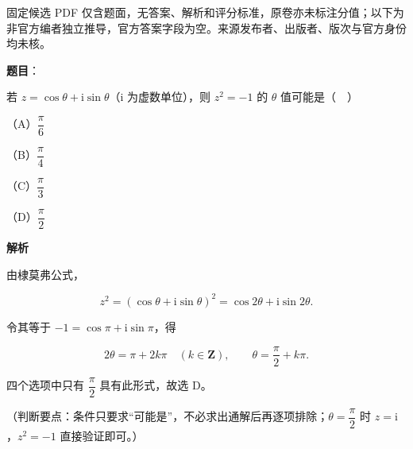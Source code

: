 

\begin{gktip}
固定候选 PDF 仅含题面，无答案、解析和评分标准，原卷亦未标注分值；以下为非官方编者独立推导，官方答案字段为空。来源发布者、出版者、版次与官方身份均未核。
\end{gktip}

\begin{answer}

\textbf{题目}：

若 $z=\cos\theta+\mathrm i\sin\theta$（$\mathrm i$ 为虚数单位），则 $z^2=-1$ 的 $\theta$ 值可能是（　）

（A）$\dfrac{\pi}{6}$

（B）$\dfrac{\pi}{4}$

（C）$\dfrac{\pi}{3}$

（D）$\dfrac{\pi}{2}$

\textbf{解析}

由棣莫弗公式，

\nopagebreak[4]
\[z^2=(\cos\theta+\mathrm i\sin\theta)^2=\cos2\theta+\mathrm i\sin2\theta.\]

令其等于 $-1=\cos\pi+\mathrm i\sin\pi$，得

\nopagebreak[4]
\[2\theta=\pi+2k\pi\quad(k\in\mathbf Z),\qquad \theta=\frac{\pi}{2}+k\pi.\]

四个选项中只有 $\dfrac{\pi}{2}$ 具有此形式，故选 D。

（判断要点：条件只要求“可能是”，不必求出通解后再逐项排除；$\theta=\dfrac{\pi}{2}$ 时 $z=\mathrm i$，$z^2=-1$ 直接验证即可。）


\end{answer}
